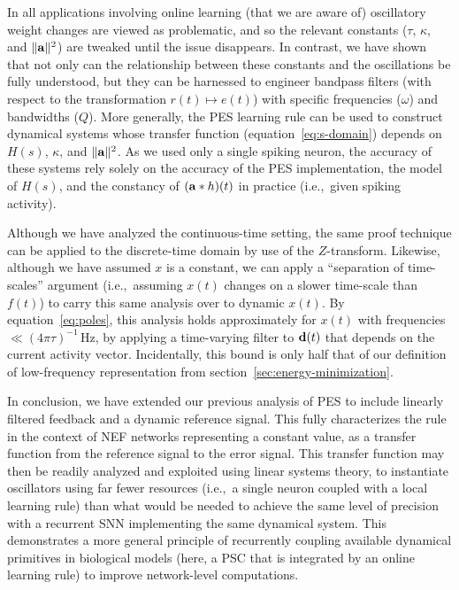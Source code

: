 In all applications involving online learning (that we are aware of) oscillatory weight changes are viewed as problematic, and so the relevant constants ($\tau$, $\kappa$, and $\| \mathbf{a} \|^2$) are tweaked until the issue disappears.
In contrast, we have shown that not only can the relationship between these constants and the oscillations be fully understood, but they can be harnessed to engineer bandpass filters (with respect to the transformation $r(t) \mapsto e(t)$) with specific frequencies ($\omega$) and bandwidths ($Q$).
More generally, the PES learning rule can be used to construct dynamical systems whose transfer function (equation~\ref{eq:s-domain}) depends on $H(s)$, $\kappa$, and $\| \mathbf{a} \|^2$.
As we used only a single spiking neuron, the accuracy of these systems rely solely on the accuracy of the PES implementation, the model of $H(s)$, and the constancy of $(\mathbf{a} \ast h)(t)$ in practice (i.e.,~given spiking activity).

Although we have analyzed the continuous-time setting, the same proof technique can be applied to the discrete-time domain by use of the $Z$-transform.
Likewise, although we have assumed $x$ is a constant, we can apply a ``separation of time-scales'' argument (i.e.,~assuming $x(t)$ changes on a slower time-scale than $f(t)$) to carry this same analysis over to dynamic $x(t)$.
By equation~\ref{eq:poles}, this analysis holds approximately for $x(t)$ with frequencies $\ll \left(4 \pi \tau \right)^{-1}$\,Hz, by applying a time-varying filter to $\mathbf{d}(t)$ that depends on the current activity vector.
Incidentally, this bound is only half that of our definition of low-frequency representation from section~\ref{sec:energy-minimization}.

In conclusion, we have extended our previous analysis of PES to include linearly filtered feedback and a dynamic reference signal.
This fully characterizes the rule in the context of NEF networks representing a constant value, as a transfer function from the reference signal to the error signal.
This transfer function may then be readily analyzed and exploited using linear systems theory, to instantiate oscillators using far fewer resources (i.e.,~a single neuron coupled with a local learning rule) than what would be needed to achieve the same level of precision with a recurrent SNN implementing the same dynamical system.
This demonstrates a more general principle of recurrently coupling available dynamical primitives in biological models (here, a PSC that is integrated by an online learning rule) to improve network-level computations.

